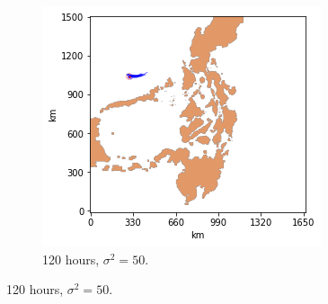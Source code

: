 \documentclass[11pt, english]{article}
\begin{document}
\begin{multicols}{2}
\begin{figure}
	\begin{subfigure}{0.33\textwidth}
		\centering
		\caption{120 hours, $\sigma^{2} = 50$.}
		\label{fig:toy-120-50}
		\includegraphics[width=\textwidth]{toy-120-50}
	\end{subfigure}\vspace{2ex}
	

\end{figure}
\end{multicols}
\end{document}

